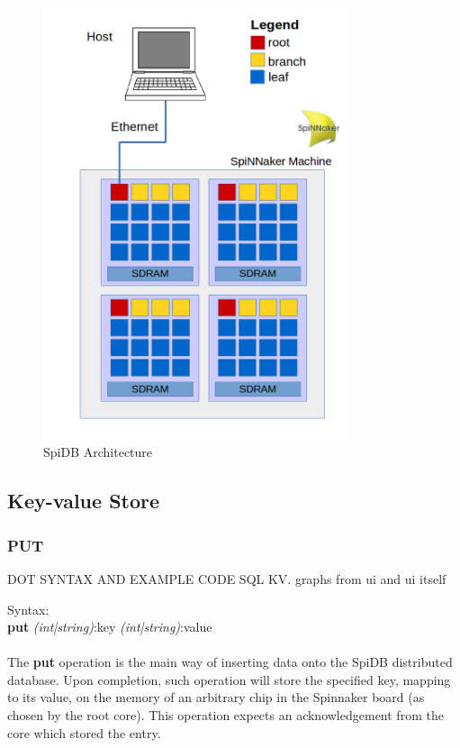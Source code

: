 \begin{figure}
\begin{center}
	\includegraphics[width=0.8\textwidth, natwidth=794, natheight=1123]{images/spiDB_architecture.png}
\end{center}
\caption{SpiDB Architecture}
\end{figure}

\subsection{Key-value Store}
\subsubsection{PUT}

DOT SYNTAX AND EXAMPLE CODE SQL KV.
graphs from ui and ui itself

Syntax:\\
\noindent
 {\large\textbf{put} \textit{(int|string)}:key \textit{(int|string)}:value} \\\\

The \textbf{put} operation is the main way of inserting data onto the SpiDB distributed database. 
Upon completion, such operation will store the specified key, mapping to its value, on the memory of an arbitrary chip in the Spinnaker board (as chosen by the root core). This operation expects an acknowledgement from the core which stored the entry.\\\\


